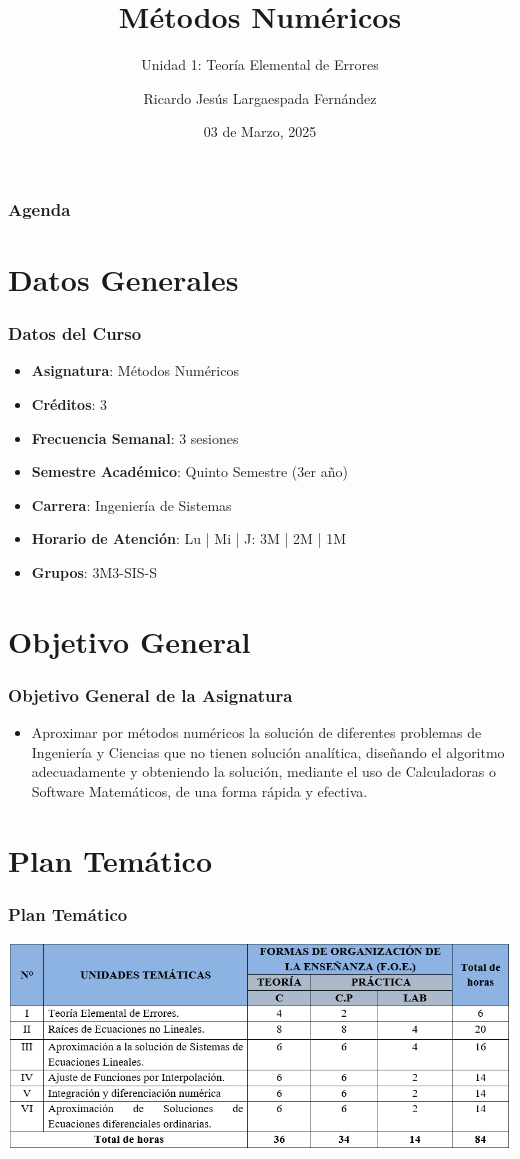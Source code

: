 \documentclass{beamer}
\title{Métodos Numéricos}
\subtitle{Unidad 1: Teoría Elemental de Errores}
\author[Ricardo Largaespada]{Ricardo Jesús Largaespada Fernández}
\institute[UNI]{Ingeniería de Sistemas, DACTIC, UNI}
\date{03 de Marzo, 2025}
\begin{document}
\frame{\titlepage}

\begin{frame}
\frametitle{Agenda}
\tableofcontents
\end{frame}

\section{Datos Generales}
\begin{frame}
\frametitle{Datos del Curso}
\begin{itemize}
    \item \textbf{Asignatura}: Métodos Numéricos
    \item \textbf{Créditos}: 3
    \item \textbf{Frecuencia Semanal}: 3 sesiones
    \item \textbf{Semestre Académico}: Quinto Semestre (3er año)
    \item \textbf{Carrera}: Ingeniería de Sistemas
    \item \textbf{Horario de Atención}: Lu | Mi | J: 3M | 2M | 1M
    \item \textbf{Grupos}: 3M3-SIS-S
\end{itemize}
\end{frame}

\section{Objetivo General}
\begin{frame}
\frametitle{Objetivo General de la Asignatura}
\begin{itemize}
    \item Aproximar por métodos numéricos la solución de diferentes problemas de Ingeniería y Ciencias que no tienen solución analítica, diseñando el algoritmo adecuadamente y obteniendo la solución, mediante el uso de Calculadoras o  Software Matemáticos, de una forma rápida y efectiva.
\end{itemize}
\end{frame}

\section{Plan Temático}

\begin{frame}
\frametitle{Plan Temático}
\begin{center}
    \includegraphics[scale=.5]{images/plan_tematico.png}
\end{center}
\end{frame}
\end{document}
